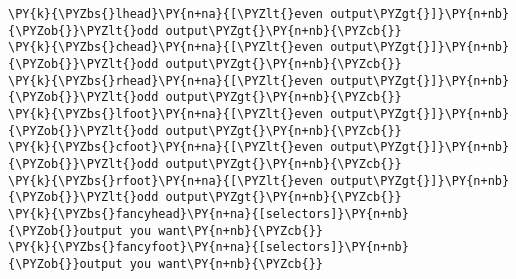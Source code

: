 \begin{Verbatim}[commandchars=\\\{\}]
\PY{k}{\PYZbs{}lhead}\PY{n+na}{[\PYZlt{}even output\PYZgt{}]}\PY{n+nb}{\PYZob{}}\PYZlt{}odd output\PYZgt{}\PY{n+nb}{\PYZcb{}}
\PY{k}{\PYZbs{}chead}\PY{n+na}{[\PYZlt{}even output\PYZgt{}]}\PY{n+nb}{\PYZob{}}\PYZlt{}odd output\PYZgt{}\PY{n+nb}{\PYZcb{}}
\PY{k}{\PYZbs{}rhead}\PY{n+na}{[\PYZlt{}even output\PYZgt{}]}\PY{n+nb}{\PYZob{}}\PYZlt{}odd output\PYZgt{}\PY{n+nb}{\PYZcb{}}
\PY{k}{\PYZbs{}lfoot}\PY{n+na}{[\PYZlt{}even output\PYZgt{}]}\PY{n+nb}{\PYZob{}}\PYZlt{}odd output\PYZgt{}\PY{n+nb}{\PYZcb{}}
\PY{k}{\PYZbs{}cfoot}\PY{n+na}{[\PYZlt{}even output\PYZgt{}]}\PY{n+nb}{\PYZob{}}\PYZlt{}odd output\PYZgt{}\PY{n+nb}{\PYZcb{}}
\PY{k}{\PYZbs{}rfoot}\PY{n+na}{[\PYZlt{}even output\PYZgt{}]}\PY{n+nb}{\PYZob{}}\PYZlt{}odd output\PYZgt{}\PY{n+nb}{\PYZcb{}}
\PY{k}{\PYZbs{}fancyhead}\PY{n+na}{[selectors]}\PY{n+nb}{\PYZob{}}output you want\PY{n+nb}{\PYZcb{}}
\PY{k}{\PYZbs{}fancyfoot}\PY{n+na}{[selectors]}\PY{n+nb}{\PYZob{}}output you want\PY{n+nb}{\PYZcb{}}
\end{Verbatim}

